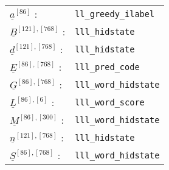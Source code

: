 \documentclass[12pt]{article}
\begin{document}
\begin{tabular}{ll}
$\underline{a}^{[86]}$ :&{\tt ll\_greedy\_ilabel}\\
$\underline{B}^{[121], [768]}$ :&{\tt lll\_hidstate}\\
$\underline{d}^{[121], [768]}$ :&{\tt lll\_hidstate}\\
$\underline{E}^{[86], [768]}$ :&{\tt lll\_pred\_code}\\
$\underline{G}^{[86], [768]}$ :&{\tt lll\_word\_hidstate}\\
$\underline{L}^{[86], [6]}$ :&{\tt lll\_word\_score}\\
$\underline{M}^{[86], [300]}$ :&{\tt lll\_word\_hidstate}\\
$\underline{n}^{[121], [768]}$ :&{\tt lll\_hidstate}\\
$\underline{S}^{[86], [768]}$ :&{\tt lll\_word\_hidstate}
\end{tabular}
\end{document}
